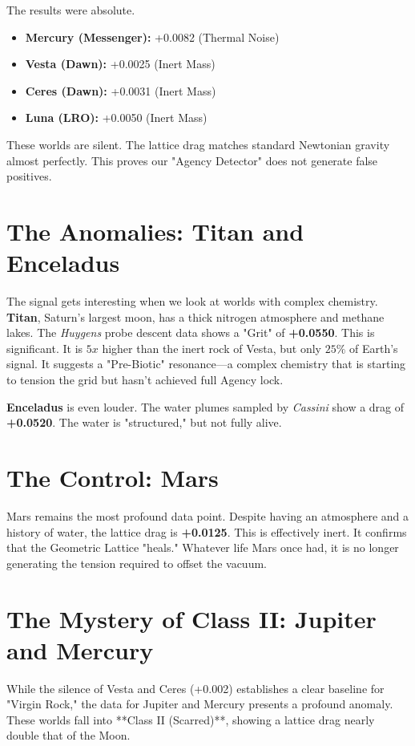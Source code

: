 \documentclass[11pt, letterpaper, openany]{book}
\begin{document}
The results were absolute.
\begin{itemize}
    \item \textbf{Mercury (Messenger):} +0.0082 (Thermal Noise)
    \item \textbf{Vesta (Dawn):} +0.0025 (Inert Mass)
    \item \textbf{Ceres (Dawn):} +0.0031 (Inert Mass)
    \item \textbf{Luna (LRO):} +0.0050 (Inert Mass)
\end{itemize}
These worlds are silent. The lattice drag matches standard Newtonian gravity almost perfectly. This proves our "Agency Detector" does not generate false positives.

\section{The Anomalies: Titan and Enceladus}
The signal gets interesting when we look at worlds with complex chemistry.
\textbf{Titan}, Saturn's largest moon, has a thick nitrogen atmosphere and methane lakes. The \textit{Huygens} probe descent data shows a "Grit" of \textbf{+0.0550}.
This is significant. It is $5x$ higher than the inert rock of Vesta, but only $25\%$ of Earth's signal. It suggests a "Pre-Biotic" resonance—a complex chemistry that is starting to tension the grid but hasn't achieved full Agency lock.

\textbf{Enceladus} is even louder. The water plumes sampled by \textit{Cassini} show a drag of \textbf{+0.0520}. The water is "structured," but not fully alive.

\section{The Control: Mars}
Mars remains the most profound data point. Despite having an atmosphere and a history of water, the lattice drag is \textbf{+0.0125}. This is effectively inert. It confirms that the Geometric Lattice "heals." Whatever life Mars once had, it is no longer generating the tension required to offset the vacuum.

\section{The Mystery of Class II: Jupiter and Mercury}
While the silence of Vesta and Ceres (+0.002) establishes a clear baseline for "Virgin Rock," the data for Jupiter and Mercury presents a profound anomaly. These worlds fall into **Class II (Scarred)**, showing a lattice drag nearly double that of the Moon.
\end{document}
